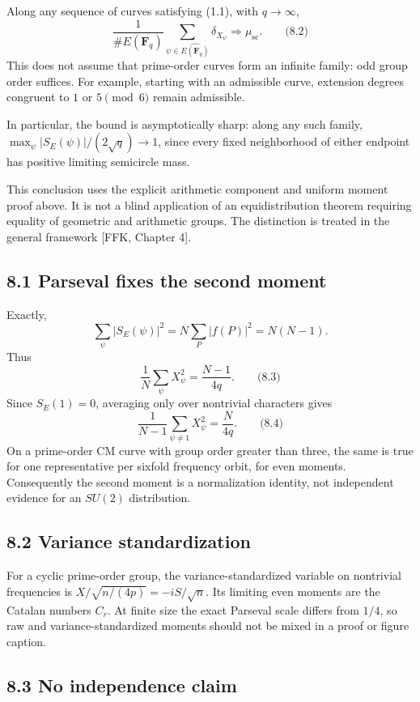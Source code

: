 \documentclass[
  11pt,
  a4paper,
]{article}
\begin{document}
Along any sequence of curves satisfying (1.1), with \(q\to\infty\), \[
\frac1{\#E(\mathbf F_q)}
\sum_{\psi\in\widehat{E(\mathbf F_q)}}\delta_{X_\psi}
\Longrightarrow\mu_{\mathrm{sc}}.
\qquad \text{(8.2)}
\] This does not assume that prime-order curves form an infinite family:
odd group order suffices. For example, starting with an admissible
curve, extension degrees congruent to \(1\) or \(5\pmod6\) remain
admissible.

In particular, the bound is asymptotically sharp: along any such family,
\(\max_\psi |S_E(\psi)|/(2\sqrt q)\to1\), since every fixed neighborhood
of either endpoint has positive limiting semicircle mass.

This conclusion uses the explicit arithmetic component and uniform
moment proof above. It is not a blind application of an equidistribution
theorem requiring equality of geometric and arithmetic groups. The
distinction is treated in the general framework {[}FFK, Chapter 4{]}.

\subsection{8.1 Parseval fixes the second
moment}\label{parseval-fixes-the-second-moment}

Exactly, \[
\sum_\psi|S_E(\psi)|^2=N\sum_P|f(P)|^2=N(N-1).
\] Thus \[
\frac1N\sum_\psi X_\psi^2=\frac{N-1}{4q}.
\qquad \text{(8.3)}
\] Since \(S_E(1)=0\), averaging only over nontrivial characters gives
\[
\frac1{N-1}\sum_{\psi\ne1}X_\psi^2=\frac{N}{4q}.
\qquad \text{(8.4)}
\] On a prime-order CM curve with group order greater than three, the
same is true for one representative per sixfold frequency orbit, for
even moments. Consequently the second moment is a normalization
identity, not independent evidence for an \(SU(2)\) distribution.

\subsection{8.2 Variance
standardization}\label{variance-standardization}

For a cyclic prime-order group, the variance-standardized variable on
nontrivial frequencies is \(X/\sqrt{n/(4p)}=-iS/\sqrt n\). Its limiting
even moments are the Catalan numbers \(C_r\). At finite size the exact
Parseval scale differs from \(1/4\), so raw and variance-standardized
moments should not be mixed in a proof or figure caption.

\subsection{8.3 No independence claim}\label{no-independence-claim}
\end{document}
